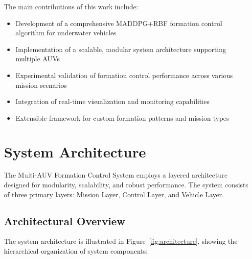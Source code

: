 \documentclass[11pt,a4paper]{article}
\begin{document}
The main contributions of this work include:
\begin{itemize}
    \item Development of a comprehensive MADDPG+RBF formation control algorithm for underwater vehicles
    \item Implementation of a scalable, modular system architecture supporting multiple AUVs
    \item Experimental validation of formation control performance across various mission scenarios
    \item Integration of real-time visualization and monitoring capabilities
    \item Extensible framework for custom formation patterns and mission types
\end{itemize}

\section{System Architecture}

The Multi-AUV Formation Control System employs a layered architecture designed for modularity, scalability, and robust performance. The system consists of three primary layers: Mission Layer, Control Layer, and Vehicle Layer.

\subsection{Architectural Overview}

The system architecture is illustrated in Figure~\ref{fig:architecture}, showing the hierarchical organization of system components:
\end{document}
